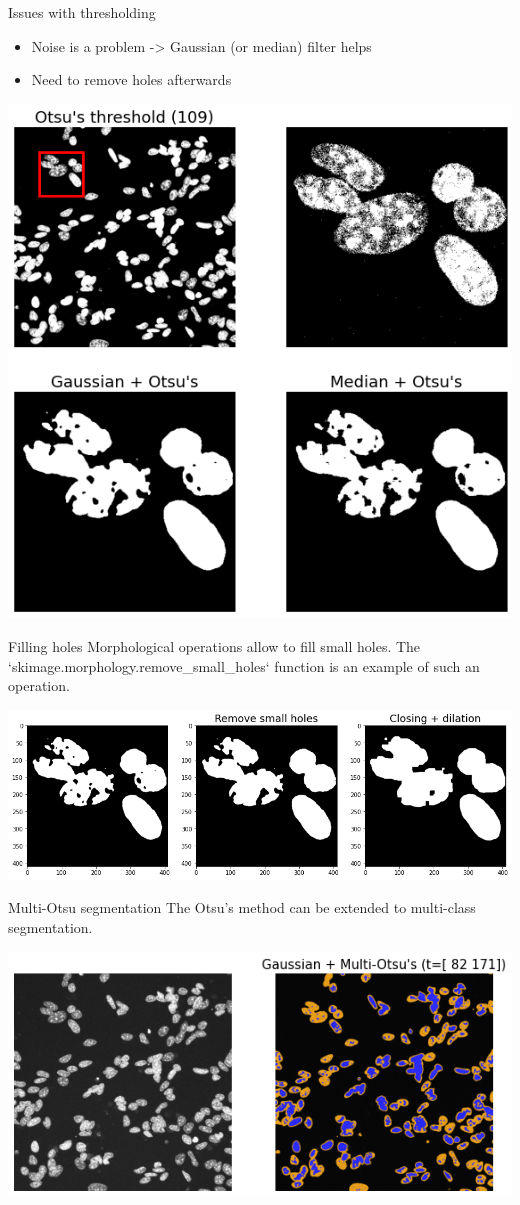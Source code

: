 \documentclass[9pt, aspectratio=169]{beamer}
\begin{document}
\begin{frame}
    {Issues with thresholding}

    \begin{itemize}
        \item Noise is a problem -> Gaussian (or median) filter helps
        \item Need to remove holes afterwards
    \end{itemize}
    \centering
    \includegraphics[width=.4\textwidth]{otsu_and_smoothing.png}
\end{frame}

\begin{frame}
    {Filling holes}
    Morphological operations allow to fill small holes.
    The `skimage.morphology.remove\_small\_holes` function is an example of such an operation.

    \includegraphics[width=\textwidth]{morphological.png}
\end{frame}
\begin{frame}
    {Multi-Otsu segmentation}
    The Otsu's method can be extended to multi-class segmentation.

    \includegraphics[width=\textwidth]{multiotsu.png}
\end{frame}
\end{document}

